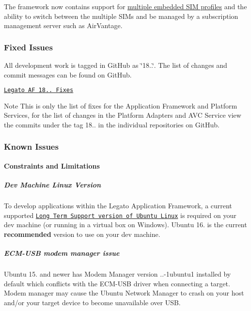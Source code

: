 The framework now contains support for \hyperlink{c_sim_le_sim_profile_switch}{multiple embedded S\+IM profiles} and the ability to switch between the multiple S\+I\+Ms and be managed by a subscription management server such as Air\+Vantage.\hypertarget{releaseNotes18040_rn1804_Fixes}{}\subsubsection{Fixed Issues}\label{releaseNotes18040_rn1804_Fixes}
All development work is tagged in Git\+Hub as \char`\"{}18..\char`\"{}. The list of changes and commit messages can be found on Git\+Hub.


\begin{DoxyItemize}
\item \href{https://github.com/legatoproject/legato-af/commits/18.04.0}{\tt Legato AF 18.. Fixes}
\end{DoxyItemize}

\begin{DoxyNote}{Note}
This is only the list of fixes for the Application Framework and Platform Services, for the list of changes in the Platform Adapters and A\+VC Service view the commits under the tag 18.. in the individual repositories on Git\+Hub.
\end{DoxyNote}
\hypertarget{releaseNotes18040_rn1804_KnownIssues}{}\subsubsection{Known Issues}\label{releaseNotes18040_rn1804_KnownIssues}
\hypertarget{releaseNotes18040_rn1804_Constraints}{}\paragraph{Constraints and Limitations}\label{releaseNotes18040_rn1804_Constraints}
\hypertarget{releaseNotes18040_rn1804_ConstraintsLinuxSupport}{}\subparagraph{Dev Machine Linux Version}\label{releaseNotes18040_rn1804_ConstraintsLinuxSupport}
To develop applications within the Legato Application Framework, a current supported \href{https://www.ubuntu.com/info/release-end-of-life}{\tt Long Term Support version of Ubuntu Linux} is required on your dev machine (or running in a virtual box on Windows). Ubuntu 16. is the current {\bfseries recommended} version to use on your dev machine.\hypertarget{releaseNotes18040_rn1804_ConstECMUSB}{}\subparagraph{E\+C\+M-\/\+U\+S\+B modem manager issue}\label{releaseNotes18040_rn1804_ConstECMUSB}
Ubuntu 15. and newer has Modem Manager version {..-\/1ubuntu1} installed by default which conflicts with the E\+C\+M-\/\+U\+SB driver when connecting a target. Modem manager may cause the Ubuntu Network Manager to crash on your host and/or your target device to become unavailable over U\+SB.

